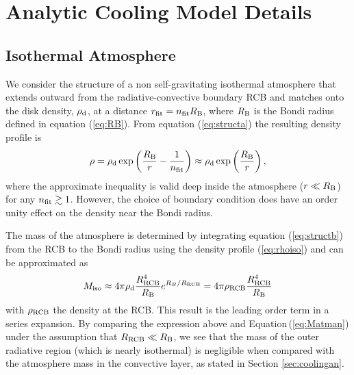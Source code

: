 \documentclass[apj, numberedappendix]{emulateapj}
\newcommand{\Eq}[1]{Equation\,(\ref{#1})}
\newcommand{\RB}{R_{\rm B}}
\newcommand{\co}{_{\rm c}}
\newcommand{\di}{_{\rm d}}
\newcommand{\cb}{_{\rm RCB}}
\begin{document}
\section{Analytic Cooling Model Details}\label{sec:analytic}

\subsection{Isothermal Atmosphere}
\label{iso}

We consider the structure of a non self-gravitating isothermal atmosphere that extends outward from the radiative-convective boundary RCB and matches onto the disk density, $\rho_{\rm d}$, at a distance $r_{\rm fit} = n_{\rm fit} \RB$, where $R_{\rm B}$ is the Bondi radius defined in equation (\ref{eq:RB}). From equation (\ref{eq:structa}) the resulting density profile is
\begin{equation} \label{eq:rhoiso}
\rho = \rho_{\rm d} \exp \left({R_{\rm B} \over r} - {1 \over n_{\rm{fit}}} \right) \approx   \rho_{\rm{d}} \exp \left(R_{\rm B} \over r  \right),
\end{equation} 
where the approximate inequality is valid deep inside the atmosphere ($r \ll \RB$) for any $n_{\rm fit} \gtrsim 1$.  However, the choice of boundary condition does have an order unity effect on the density near the Bondi radius. 

The mass of the atmosphere is determined by integrating equation (\ref{eq:structb}) from the RCB to the Bondi radius using the density profile (\ref{eq:rhoiso}) and can be approximated as
\begin{equation} \label{eq:MatmISO}
M_{\rm iso} \approx 4 \pi \rho\di {R\cb^4 \over R_{\rm B}} e^{R_B/R\cb} = 4\pi \rho\cb \frac{R\cb^4}{R_{\rm B}}
\end{equation}
with $\rho\cb$ the density at the RCB.
This result is the leading order term in a series expansion. By comparing the expression above and \Eq{eq:Matman} under the assumption that $R\cb \ll R_{\rm B}$, we see that the mass of the outer radiative region (which is nearly isothermal) is negligible when compared with the atmosphere mass in the convective layer, as stated in Section \ref{sec:coolingan}.
\end{document}

